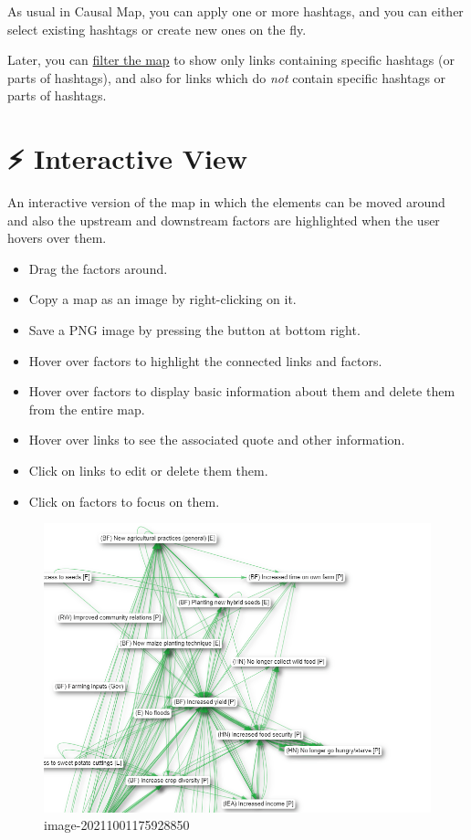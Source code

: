 \documentclass[
]{book}
\providecommand{\tightlist}{%
  \setlength{\itemsep}{0pt}\setlength{\parskip}{0pt}}
\begin{document}
As usual in Causal Map, you can apply one or more hashtags, and you can either select existing hashtags or create new ones on the fly.

Later, you can \href{https://guide.causalmap.app/analysis.html\#filtering-the-map-by-link-hashtag-memo}{filter the map} to show only links containing specific hashtags (or parts of hashtags), and also for links which do \emph{not} contain specific hashtags or parts of hashtags.

\hypertarget{interactive-view}{%
\chapter{⚡ Interactive View}\label{interactive-view}}

An interactive version of the map in which the elements can be moved around and also the upstream and downstream factors are highlighted when the user hovers over them.

\begin{itemize}
\tightlist
\item
  Drag the factors around.
\item
  Copy a map as an image by right-clicking on it.
\item
  Save a PNG image by pressing the button at bottom right.
\item
  Hover over factors to highlight the connected links and factors.
\item
  Hover over factors to display basic information about them and delete them from the entire map.
\item
  Hover over links to see the associated quote and other information.
\item
  Click on links to edit or delete them them.
\item
  Click on factors to focus on them.
\end{itemize}

\begin{figure}
\centering
\includegraphics[width=6.77083in,height=\textheight]{_assets/focus.gif}
\caption{image-20211001175928850}
\end{figure}
\end{document}

